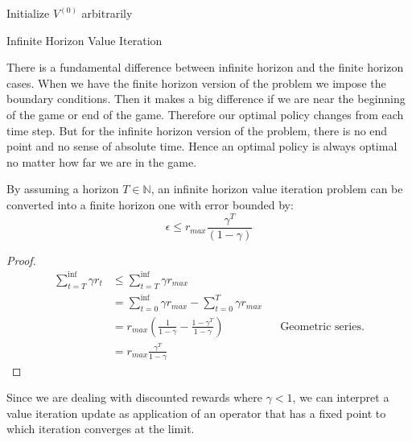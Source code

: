 \documentclass{article}
\begin{document}
\begin{algorithm}[H]
Initialize $V^{(0)}$ arbitrarily$\;$

\SetAlgoLined
 \caption{Infinite Horizon Value Iteration}
 \label{alg:infinite_horizon_VI}
\end{algorithm}
There is a fundamental difference between infinite horizon and the finite horizon cases. When we have the finite horizon version of the problem we impose the boundary conditions. Then it makes a big difference if we are near the beginning of the game or end of the game. Therefore our optimal policy changes from each time step. But for the infinite horizon version of the problem, there is no end point and no sense of absolute time. Hence an optimal policy is always optimal no matter how far we are in the game. 

\begin{thm}
By assuming a horizon $T \in \mathbb{N}$, an infinite horizon value iteration problem can be converted into a finite horizon one with error bounded by:
\[
\epsilon \leq r_{max}\frac{\gamma^{T}}{(1-\gamma)}
\]
\end{thm}

\begin{proof}
\begin{align*}
\sum_{t=T}^{\inf} \gamma r_t &\leq \sum_{t=T}^{\inf} \gamma r_{max} &&\\
&= \sum_{t=0}^{\inf} \gamma r_{max} - \sum_{t=0}^{T} \gamma r_{max} &&\\
&= r_{max} \left( \frac{1}{1-\gamma} - \frac{1-\gamma^T}{1-\gamma} \right) &&\text{Geometric series.}\\
&= r_{max} \frac{\gamma^T}{1-\gamma} &&
\end{align*}
\end{proof}

Since we are dealing with discounted rewards where $\gamma < 1$, we can interpret a value iteration update as application of an operator that has a fixed point to which iteration converges at the limit.
\end{document}
